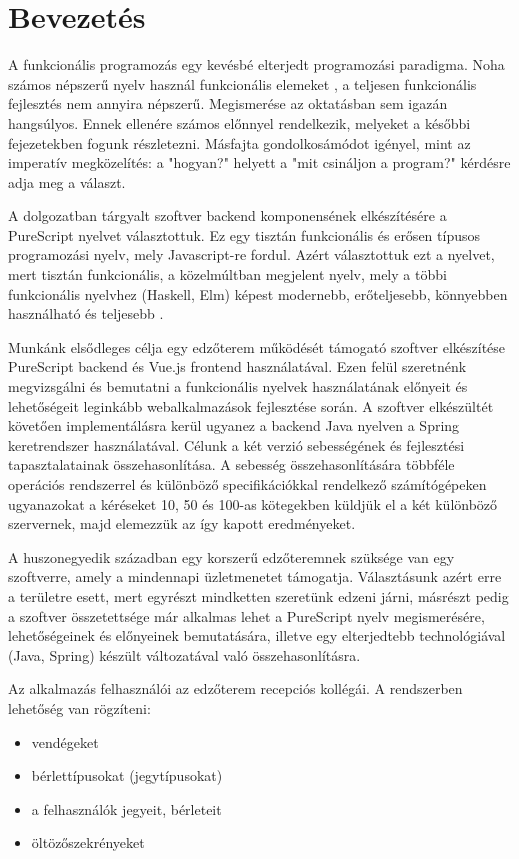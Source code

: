 \documentclass[12pt]{article}
\begin{document}
\section*{Bevezetés}

A funkcionális programozás egy kevésbé elterjedt programozási paradigma. Noha számos népszerű nyelv használ funkcionális elemeket \cite{Java} \cite{py} \cite{cpp},  a teljesen funkcionális fejlesztés nem annyira népszerű. Megismerése az oktatásban sem igazán hangsúlyos. Ennek ellenére számos előnnyel rendelkezik, melyeket a későbbi fejezetekben fogunk részletezni. Másfajta gondolkosámódot igényel, mint az imperatív megközelítés: a "hogyan?" helyett a "mit csináljon a program?" kérdésre adja meg a választ.

A dolgozatban tárgyalt szoftver backend komponensének elkészítésére a PureScript nyelvet választottuk. Ez egy tisztán funkcionális és erősen típusos programozási nyelv, mely Javascript-re fordul. Azért választottuk ezt a nyelvet, mert tisztán funkcionális, a közelmúltban megjelent nyelv, mely a többi funkcionális nyelvhez (Haskell, Elm) képest modernebb, erőteljesebb, könnyebben használható és teljesebb \cite{CS}.

Munkánk elsődleges célja egy edzőterem működését támogató szoftver elkészítése PureScript backend és Vue.js frontend használatával. Ezen felül szeretnénk megvizsgálni és bemutatni a funkcionális nyelvek használatának előnyeit és lehetőségeit leginkább webalkalmazások fejlesztése során. A szoftver elkészültét követően implementálásra kerül ugyanez a backend Java nyelven a Spring keretrendszer használatával. Célunk a két verzió sebességének és fejlesztési tapasztalatainak összehasonlítása. A sebesség összehasonlítására többféle operációs rendszerrel és különböző specifikációkkal rendelkező számítógépeken ugyanazokat a kéréseket 10, 50 és 100-as kötegekben küldjük el a két különböző szervernek, majd elemezzük az így kapott eredményeket.

A huszonegyedik században egy korszerű edzőteremnek szüksége van egy szoftverre, amely a mindennapi üzletmenetet támogatja. Választásunk azért erre a területre esett, mert egyrészt mindketten szeretünk edzeni járni, másrészt pedig a szoftver összetettsége már alkalmas lehet a PureScript nyelv megismerésére, lehetőségeinek és előnyeinek bemutatására, illetve egy elterjedtebb technológiával (Java, Spring) készült változatával való összehasonlításra.

Az alkalmazás felhasználói az edzőterem recepciós kollégái. A rendszerben lehetőség van rögzíteni:
\begin{itemize}
\item vendégeket
\item bérlettípusokat (jegytípusokat)
\item a felhasználók jegyeit, bérleteit
\item öltözőszekrényeket
\end{itemize}
\end{document}
